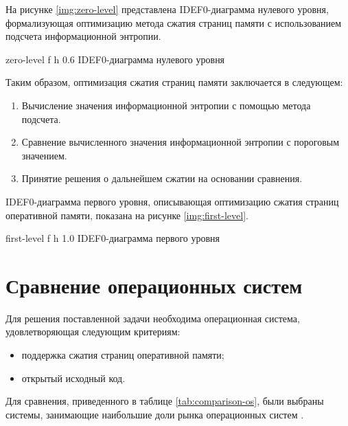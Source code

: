 На рисунке \ref{img:zero-level} представлена IDEF0-диаграмма нулевого уровня, формализующая оптимизацию метода сжатия страниц памяти с использованием подсчета информационной энтропии.

    {zero-level}
    {f}
    {h}
    {0.6\textwidth}
    {IDEF0-диаграмма нулевого уровня}
    
Таким образом, оптимизация сжатия страниц памяти заключается в следующем:

\begin{enumerate}
	\item Вычисление значения информационной энтропии с помощью метода подсчета.
	\item Сравнение вычисленного значения информационной энтропии с пороговым значением.
	\item Принятие решения о дальнейшем сжатии на основании сравнения.
\end{enumerate}

IDEF0-диаграмма первого уровня, описывающая оптимизацию сжатия страниц оперативной памяти, показана на рисунке \ref{img:first-level}.
    
    {first-level}
    {f}
    {h}
    {1.0\textwidth}
    {IDEF0-диаграмма первого уровня}

\section{Сравнение операционных систем}

Для решения поставленной задачи необходима операционная система, удовлетворяющая следующим критериям:

\begin{itemize}
	\item поддержка сжатия страниц оперативной памяти;
	\item открытый исходный код.
\end{itemize}

Для сравнения, приведенного в таблице \ref{tab:comparison-os}, были выбраны системы, занимающие наибольшие доли рынка операционных систем \cite{stat}.

